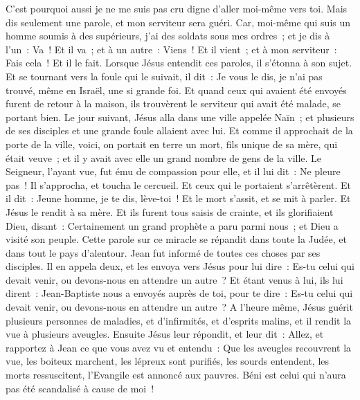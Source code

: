 \begin{multicols}{2}
C'est pourquoi aussi je ne me suis pas cru digne d'aller moi-même vers toi. Mais dis seulement une parole, et mon serviteur sera guéri.
Car, moi-même qui suis un homme soumis à des supérieurs, j'ai des soldats sous mes ordres~; et je dis à l'un~: Va~! Et il va~; et à un autre~: Viens~! Et il vient~; et à mon serviteur~: Fais cela~! Et il le fait.
Lorsque Jésus entendit ces paroles, il s'étonna à son sujet. Et se tournant vers la foule qui le suivait, il dit~: Je vous le dis, je n'ai pas trouvé, même en Israël, une si grande foi.
Et quand ceux qui avaient été envoyés furent de retour à la maison, ils trouvèrent le serviteur qui avait été malade, se portant bien.
Le jour suivant, Jésus alla dans une ville appelée Naïn~; et plusieurs de ses disciples et une grande foule allaient avec lui.
Et comme il approchait de la porte de la ville, voici, on portait en terre un mort, fils unique de sa mère, qui était veuve~; et il y avait avec elle un grand nombre de gens de la ville.
Le Seigneur, l'ayant vue, fut ému de compassion pour elle, et il lui dit~: Ne pleure pas~!
Il s'approcha, et toucha le cercueil. Et ceux qui le portaient s'arrêtèrent. Et il dit~: Jeune homme, je te dis, lève-toi~!
Et le mort s'assit, et se mit à parler. Et Jésus le rendit à sa mère.
Et ils furent tous saisis de crainte, et ils glorifiaient Dieu, disant~: Certainement un grand prophète a paru parmi nous~; et Dieu a visité son peuple.
Cette parole sur ce miracle se répandit dans toute la Judée, et dans tout le pays d'alentour.
Jean fut informé de toutes ces choses par ses disciples.
Il en appela deux, et les envoya vers Jésus pour lui dire~: Es-tu celui qui devait venir, ou devons-nous en attendre un autre~?
Et étant venus à lui, ils lui dirent~: Jean-Baptiste nous a envoyés auprès de toi, pour te dire~: Es-tu celui qui devait venir, ou devons-nous en attendre un autre~?
A l'heure même, Jésus guérit plusieurs personnes de maladies, et d'infirmités, et d'esprits malins, et il rendit la vue à plusieurs aveugles.
Ensuite Jésus leur répondit, et leur dit~: Allez, et rapportez à Jean ce que vous avez vu et entendu~: Que les aveugles recouvrent la vue, les boiteux marchent, les lépreux sont purifiés, les sourds entendent, les morts ressuscitent, l'Evangile est annoncé aux pauvres.
Béni est celui qui n'aura pas été scandalisé à cause de moi~!

\end{multicols}

